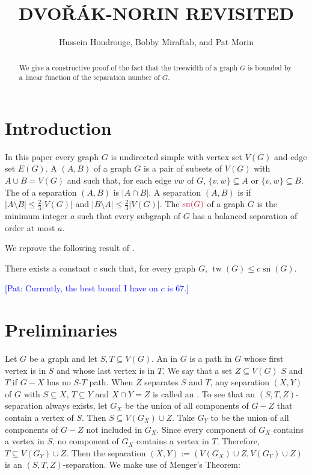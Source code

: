 \documentclass{patmorin}
\title{\MakeUppercase{Dvo\v{r}ák-Norin Revisited}}
\author{Hussein Houdrouge, Bobby Miraftab, and Pat Morin}
\date{}
\newcommand{\pat}[1]{\textcolor{Blue}{[Pat: #1]}}
\DeclareMathOperator{\sep}{sn}
\DeclareMathOperator{\tw}{tw}
\begin{document}
\maketitle

\begin{abstract}
  We give a constructive proof of the fact that the treewidth of a graph $G$ is bounded by a linear function of the separation number of $G$.
\end{abstract}


\section{Introduction}

In this paper every graph $G$ is undirected simple with vertex set $V(G)$ and edge set $E(G)$.  A  $(A,B)$ of a graph $G$ is a pair of subsets of $V(G)$ with $A\cup B= V(G)$ and such that, for each edge $vw$ of $G$, $\{v,w\}\subseteq A$ or $\{v,w\}\subseteq B$.  The  of a separation $(A,B)$ is $|A\cap B|$.  A separation $(A,B)$ is  if $|A\setminus B|\le \tfrac{2}{3}|V(G)|$ and $|B\setminus A|\le \tfrac{2}{3}|V(G)|$.  The  $\mathdefin{\sep(G)}$ of a graph $G$ is the minimum integer $a$ such that every subgraph of $G$ has a balanced separation of order at most $a$.

We reprove the following result of \citet{dvorak.norin:treewidth}.
\begin{thm}\label{main_result}
  There exists a constant $c$ such that, for every graph $G$, $\tw(G)\le c\sep(G)$.
\end{thm}

\pat{Currently, the best bound I have on $c$ is $67$.}

\section{Preliminaries}

Let $G$ be a graph and let $S,T\subseteq V(G)$. An  in $G$ is a path in $G$ whose first vertex is in $S$ and whose last vertex is in $T$.  We say that a set $Z\subseteq V(G)$  $S$ and $T$ if $G-X$ has no $S$-$T$ path.  When $Z$ separates $S$ and $T$, any separation $(X,Y)$ of $G$ with $S\subseteq X$, $T\subseteq Y$ and $X\cap Y=Z$ is called an . To see that an $(S,T,Z)$-separation always exists, let $G_X$ be the union of all components of $G-Z$ that contain a vertex of $S$. Then $S\subseteq V(G_X)\cup Z$. Take $G_Y$ to be the union of all components of $G-Z$ not included in $G_X$. Since  every component of $G_X$ contains a vertex in $S$, no component of $G_X$ contains a vertex in $T$.  Therefore, $T\subseteq V(G_Y)\cup Z$.  Then the separation $(X,Y):=(V(G_X)\cup Z, V(G_Y)\cup Z)$ is an $(S,T,Z)$-separation.  We make use of Menger's Theorem:
\end{document}
